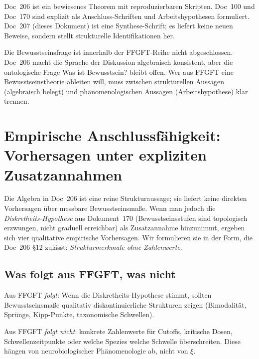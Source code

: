 Doc~206 ist ein bewiesenes Theorem mit reproduzierbaren Skripten. Doc~100 und Doc~170 sind explizit als Anschluss-Schriften und Arbeitshypothesen formuliert. Doc~207 (dieses Dokument) ist eine Synthese-Schrift; es liefert keine neuen Beweise, sondern stellt strukturelle Identifikationen her.

\begin{interpretation}
Die Bewusstseinsfrage ist innerhalb der FFGFT-Reihe nicht abgeschlossen. Doc~206 macht die Sprache der Diskussion algebraisch konsistent, aber die ontologische Frage \glqq Was ist Bewusstsein?\grqq{} bleibt offen. Wer aus FFGFT eine Bewusstseinstheorie ableiten will, muss zwischen strukturellen Aussagen (algebraisch belegt) und phänomenologischen Aussagen (Arbeitshypothese) klar trennen.
\end{interpretation}

\section{Empirische Anschlussfähigkeit: Vorhersagen unter expliziten Zusatzannahmen}\label{sec:vorhersagen}

Die Algebra in Doc~206 ist eine reine Strukturaussage; sie liefert keine direkten Vorhersagen über messbare Bewusstseinsmaße. Wenn man jedoch die \emph{Diskretheits-Hypothese} aus Dokument~170 (Bewusstseinsstufen sind topologisch erzwungen, nicht graduell erreichbar) als Zusatzannahme hinzunimmt, ergeben sich vier qualitative empirische Vorhersagen. Wir formulieren sie in der Form, die Doc~206 \S12 zulässt: \emph{Strukturmerkmale ohne Zahlenwerte}.

\subsection{Was folgt aus FFGFT, was nicht}\label{sec:vorhersagen_folgt}

\begin{important}
Aus FFGFT \emph{folgt}: Wenn die Diskretheits-Hypothese stimmt, sollten Bewusstseinsmaße qualitativ diskontinuierliche Strukturen zeigen (Bimodalität, Sprünge, Kipp-Punkte, taxonomische Schwellen).

Aus FFGFT \emph{folgt nicht}: konkrete Zahlenwerte für Cutoffs, kritische Dosen, Schwellenzeitpunkte oder welche Spezies welche Schwelle überschreiten. Diese hängen von neurobiologischer Phänomenologie ab, nicht von $\xi$.
\end{important}

